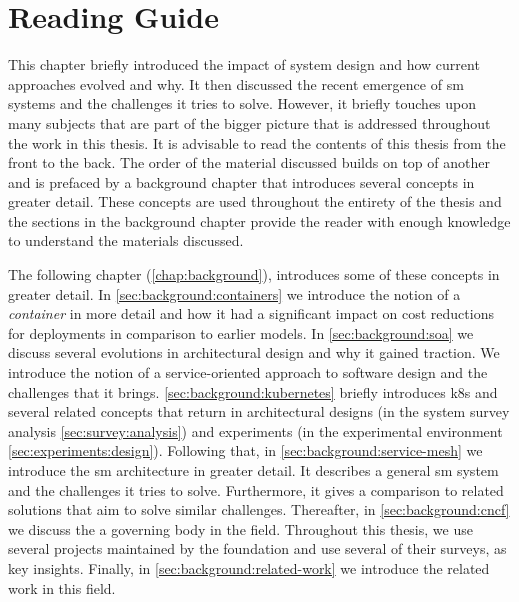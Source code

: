 \section{Reading Guide}
\label{sec:introduction:reading-guide}

This chapter briefly introduced the impact of system design and how current approaches evolved and why. It then discussed the recent emergence of \gls{sm} systems and the challenges it tries to solve. However, it briefly touches upon many subjects that are part of the bigger picture that is addressed throughout the work in this thesis. It is advisable to read the contents of this thesis from the front to the back. The order of the material discussed builds on top of another and is prefaced by a background chapter that introduces several concepts in greater detail. These concepts are used throughout the entirety of the thesis and the sections in the background chapter provide the reader with enough knowledge to understand the materials discussed.

The following chapter (\cref{chap:background}), introduces some of these concepts in greater detail. In \cref{sec:background:containers} we introduce the notion of a \textit{container} in more detail and how it had a significant impact on cost reductions for deployments in comparison to earlier models. In \cref{sec:background:soa} we discuss several evolutions in architectural design and why it gained traction. We introduce the notion of a service-oriented approach to software design and the challenges that it brings. \cref{sec:background:kubernetes} briefly introduces \gls{k8s} and several related concepts that return in architectural designs (in the system survey analysis \cref{sec:survey:analysis}) and experiments (in the experimental environment \cref{sec:experiments:design}). Following that, in \cref{sec:background:service-mesh} we introduce the \gls{sm} architecture in greater detail. It describes a general \gls{sm} system and the challenges it tries to solve. Furthermore, it gives a comparison to related solutions that aim to solve similar challenges. Thereafter, in \cref{sec:background:cncf} we discuss the  a governing body in the field. Throughout this thesis, we use several projects maintained by the foundation and use several of their surveys, as key insights. Finally, in \cref{sec:background:related-work} we introduce the related work in this field.